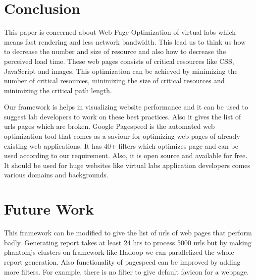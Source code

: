\documentclass[conference]{IEEEtran}
\begin{document}
\section{Conclusion}
\label{sec-7}
This paper is concerned about Web Page Optimization of virtual labs which means fast rendering and less
network bandwidth. This lead us to think us how to decrease the number and size of
resource and also how to decrease the perceived load time. These web pages consists
of critical resources like CSS, JavaScript and images. This optimization can be
achieved by minimizing the number of critical resources, minimizing the size of
critical resources and minimizing the critical path length.

 Our framework is helps in visualizing website performance and
it can be used to suggest lab developers to work on these best practices. Also it
gives the list of urls pages which are broken. Google Pagespeed is the automated web optimization
tool that comes as a saviour for optimizing web pages of already existing web applications. It has 40+
filters which optimizes page and can be used according to our requirement. Also,
it is open source and available for free. It should be used for huge websites like virtual labs
application developers comes various domains and backgrounds.
 
\section{Future Work}\label{sec-8}
This framework can be modified to give the list of urls of web pages that perform badly.
Generating report takes at least 24 hrs to process 5000 urls but by
making phantomjs clusters on framework like Hadoop we can parallelized the whole report generation.
Also functionality of pagespeed can be improved by adding more filters. For example, there is no filter to give default
favicon for a webpage.
\end{document}
